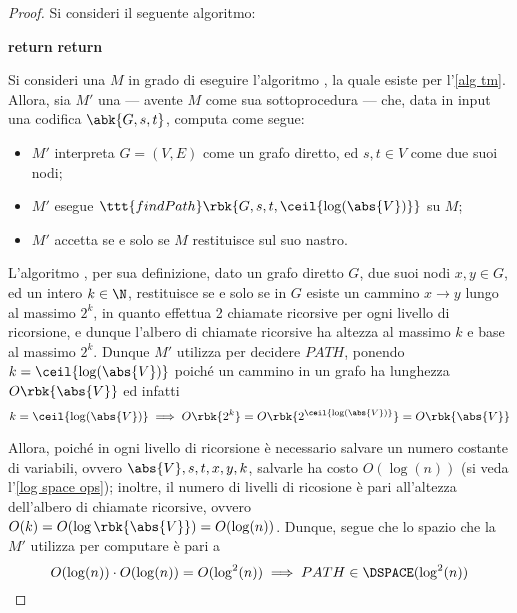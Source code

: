 \documentclass[a4paper, 12pt]{report}
\begin{document}
    \begin{proof}
        Si consideri il seguente algoritmo:

        \begin{algorithmic}[1]
                        \State \textbf{return} 
                    \Else
                        \State \textbf{return} 
                    \EndIf
                            \State {} 
                        \EndIf
                    \EndFor

                    \State {} 
                \EndIf
            \EndFunction
        \end{algorithmic}

        Si consideri una \TM $M$ in grado di eseguire l'algoritmo , la quale esiste per l'\cref{alg tm}. Allora, sia $M'$ una \TM --- avente $M$ come sua sottoprocedura --- che, data in input una codifica $\abk{G, s, t}$, computa come segue:

        \begin{itemize}
            \item $M'$ interpreta $G = (V, E)$ come un grafo diretto, ed $s, t \in V$ come due suoi nodi;
            \item $M'$ esegue $\ttt{findPath}\rbk{G, s, t, \ceil{\log(\abs{V})}}$ su $M$;
            \item $M'$ accetta se e solo se $M$ restituisce  sul suo nastro.
        \end{itemize}

        L'algoritmo , per sua definizione, dato un grafo diretto $G$, due suoi nodi $x, y \in G$, ed un intero $k \in \N$, restituisce  se e solo se in $G$ esiste un cammino $x \to y$ lungo al massimo $2^k$, in quanto  effettua 2 chiamate ricorsive per ogni livello di ricorsione, e dunque l'albero di chiamate ricorsive ha altezza al massimo $k$ e base al massimo $2^k$. Dunque $M'$ utilizza  per decidere $PATH$, ponendo $k = \ceil{\log(\abs{V})}$ poiché un cammino in un grafo ha lunghezza $O\rbk{\abs{V}}$ ed infatti $$k = \ceil{\log(\abs{V})} \implies O\rbk{2^k} = O\rbk{2^{\ceil{\log(\abs{V})}}} = O\rbk{\abs{V}}$$

        Allora, poiché in ogni livello di ricorsione è necessario salvare un numero costante di variabili, ovvero $\abs{V}, s, t, x, y, k$, salvarle ha costo $O(\log(n))$ (si veda l'\cref{log space ops}); inoltre, il numero di livelli di ricosione è pari all'altezza dell'albero di chiamate ricorsive, ovvero $O(k) = O(\log \rbk{\abs{V}}) = O(\log(n))$. Dunque, segue che lo spazio che la \TM $M'$ utilizza per computare è pari a $$O(\log(n)) \cdot O(\log(n)) = O(\log^2(n)) \implies PATH \in \DSPACE(\log^2(n))$$
    \end{proof}
    
\end{document}
